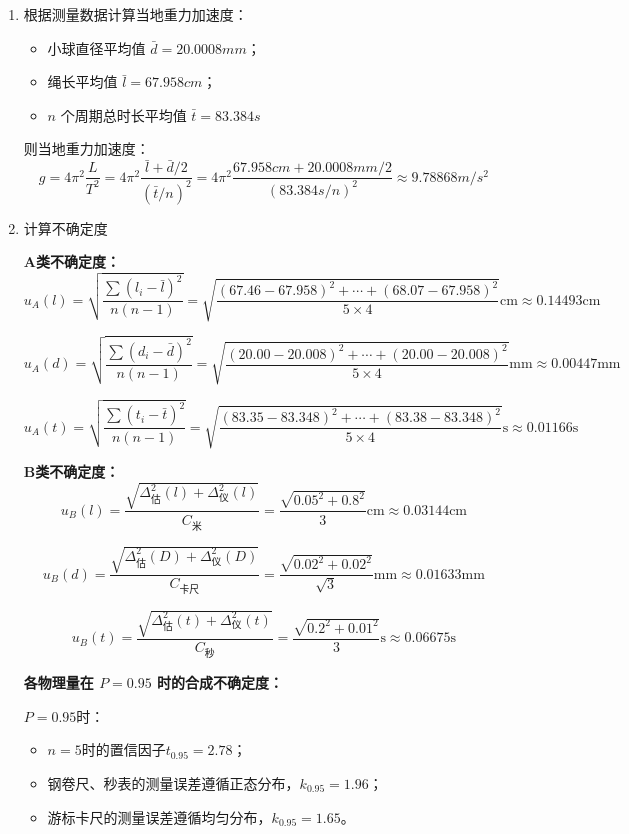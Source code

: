 \documentclass[12pt,a4paper]{article}
\begin{document}
	\begin{enumerate}
		
	\item 根据测量数据计算当地重力加速度：

	\begin{itemize}
		\item 小球直径平均值 $\bar{d} = 20.0008mm$；
		\item 绳长平均值 $\bar{l} = 67.958cm$；
		\item $n$ 个周期总时长平均值 $\bar{t} = 83.384s$
	\end{itemize}

	则当地重力加速度：
	$$g = 4\pi^2\dfrac{L}{T^2} = 4\pi^2\dfrac{\bar{l} + \bar{d}/2}{(\bar{t}/n)^2} = 4\pi^2\dfrac{67.958cm + 20.0008mm/2}{(83.384s/n)^2} \approx 9.78868 m/s^2$$

	\item 计算不确定度
	
	\textbf{A类不确定度：}
	\[ u_A(l) = \sqrt{\frac{\sum(l_{i} - \bar{l})^2}{n(n-1)}} = \sqrt{\frac{(67.46 - 67.958)^2 + \cdots + (68.07 - 67.958)^2}{5 \times 4}}\mathrm{cm} \approx 0.14493\mathrm{cm} \] 
	
	\[ u_A(d) = \sqrt{\frac{\sum(d_i - \bar{d})^2}{n(n-1)}} = \sqrt{\frac{(20.00 - 20.008)^2 + \cdots + (20.00 - 20.008)^2}{5 \times 4}}\mathrm{mm} \approx 0.00447\mathrm{mm} \]
	
	\[ u_A(t) = \sqrt{\frac{\sum(t_i - \bar{t})^2}{n(n-1)}} = \sqrt{\frac{(83.35 - 83.348)^2 + \cdots + (83.38 - 83.348)^2}{5 \times 4}}\mathrm{s} \approx 0.01166\mathrm{s} \]
	
	\textbf{B类不确定度：}
	\[ u_B(l) = \frac{\sqrt{\Delta^{2}_{\text{估}}(l) + \Delta^{2}_{\text{仪}}(l)}}{C_\text{米}}  = \frac{\sqrt{0.05^2 + 0.8^2}}{3}\mathrm{cm} \approx 0.03144\mathrm{cm} \]
	
	\[ u_B(d) = \frac{\sqrt{\Delta^{2}_{\text{估}}(D) + \Delta^{2}_{\text{仪}}(D)}}{C_\text{卡尺}}  = \frac{\sqrt{0.02^2 + 0.02^2}}{\sqrt{3}}\mathrm{mm} \approx 0.01633\mathrm{mm} \]
	
	\[ u_B(t) = \frac{\sqrt{\Delta^{2}_{\text{估}}(t) + \Delta^{2}_{\text{仪}}(t)}}{C_\text{秒}}  = \frac{\sqrt{0.2^2 + 0.01^2}}{3}\mathrm{s} \approx 0.06675\mathrm{s} \]

	\textbf{各物理量在 $P = 0.95$ 时的合成不确定度：}
	
	$P=0.95$时：
	\begin{itemize}
		\item $n = 5$时的置信因子$t_{0.95}=2.78$；
		\item 钢卷尺、秒表的测量误差遵循正态分布，$k_{0.95}=1.96$；
		\item 游标卡尺的测量误差遵循均匀分布，$k_{0.95}=1.65$。
	\end{itemize}
	

\end{enumerate}
\end{document}
